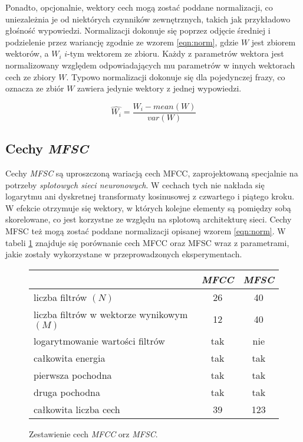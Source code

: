 \documentclass[shortabstract, mgr]{iithesis}
\begin{document}
	Ponadto, opcjonalnie, wektory cech mogą zostać poddane normalizacji, co uniezależnia je od niektórych czynników zewnętrznych, takich jak przykładowo głośność wypowiedzi. Normalizacji dokonuje się poprzez odjęcie średniej i podzielenie przez wariancję zgodnie ze wzorem \ref{eqn:norm}, gdzie $W$ jest zbiorem wektorów, a $W_i$ $i$-tym wektorem ze zbioru. Każdy z parametrów wektora jest normalizowany względem odpowiadających mu parametrów w innych wektorach cech ze zbiory $W$. Typowo normalizacji dokonuje się dla pojedynczej frazy, co oznacza ze zbiór $W$ zawiera jedynie wektory z jednej wypowiedzi.
	
	\begin{equation}
		\hat{W_i} = \frac{W_i - mean(W)}{var(W)}
		\label{eqn:norm}
	\end{equation}

	\subsection{Cechy \textit{MFSC}}
	\label{sec:Feature_vec_mfsc}
	
	Cechy \textit{MFSC} są uproszczoną wariacją cech MFCC, zaprojektowaną specjalnie na potrzeby \textit{splotowych sieci neuronowych}. W cechach tych nie nakłada się logarytmu ani dyskretnej transformaty kosinusowej z czwartego i piątego kroku. W efekcie otrzymuje się wektory, w których kolejne elementy są pomiędzy sobą skorelowane, co jest korzystne ze względu na splotową architekturę sieci. Cechy MFSC też mogą zostać poddane normalizacji opisanej wzorem \ref{eqn:norm}. W tabeli \ref{fig:feature_comparision} znajduje się porównanie cech MFCC oraz MFSC wraz z parametrami, jakie zostały wykorzystane w przeprowadzonych eksperymentach.
	
	\begin{figure}
		\begin{center}
			\begin{tabular}{|l|c|c|}
				\hline
				                                          & \textit{MFCC} & \textit{MFSC} \\ 
                \hline
				liczba filtrów $(N)$                      &       26      &      40       \\
				liczba filtrów w wektorze wynikowym $(M)$ &       12      &      40       \\  
				logarytmowanie wartości filtrów           &       tak     &      nie      \\
				całkowita energia                         &       tak     &      tak      \\
				pierwsza pochodna                         &       tak     &      tak      \\
				druga pochodna                            &       tak     &      tak      \\
				całkowita liczba cech                     &       39      &      123      \\
				\hline
				
			\end{tabular}			
		\end{center}
		\label{fig:feature_comparision}
		\caption{Zestawienie cech \textit{MFCC} orz \textit{MFSC}.}
	\end{figure}
	
\end{document}
